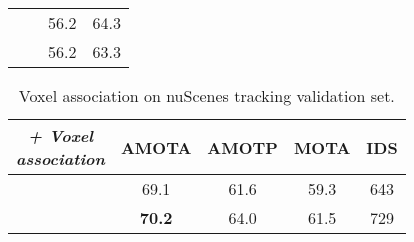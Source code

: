 \documentclass[10pt,twocolumn,letterpaper]{article}
\newcommand{\cmark}{\ding{51}}\newcommand{\xmark}{\ding{55}}\renewcommand{\thefootnote}{}
\begin{document}
{\begin{table}[t]
\begin{center}
\begin{tabular}{|c|c|cc|}
\cmark & \xmark & 56.2 & 64.3 \\
\cmark & \cmark & 56.2 & 63.3 \\
\hline
\end{tabular}
\label{tab:nuscenes-maxpool-ablation}
\end{center}
\end{table}
\begin{table}[t]
\begin{center}
\caption{Voxel association on nuScenes tracking validation set.}
\begin{tabular}{|c|c|ccc|}
\hline
\makecell[c]{\em + Voxel\\\em association}      &   AMOTA    & AMOTP & MOTA & IDS \\ \hline
\xmark & 69.1 & 61.6 & 59.3 & 643 \\
\cmark   & \textbf{70.2} & 64.0 & 61.5 & 729 \\
\hline
\end{tabular}
\label{tab:nuscenes-voxel-tracking}
\end{center}
\end{table}

}
\end{document}
